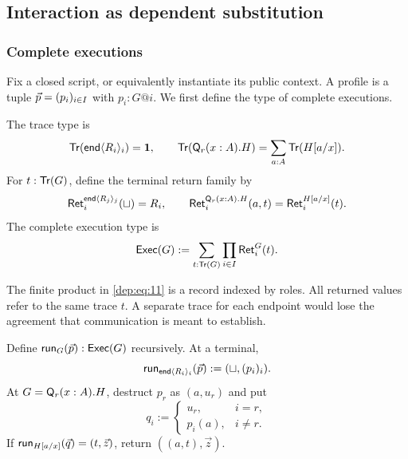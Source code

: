 \subsection{Interaction as dependent substitution}
\label{sec:interaction}

\subsubsection{Complete executions}

Fix a closed script, or equivalently instantiate its public context. A profile
is a tuple $\vec p=(p_i)_{i\in I}$ with $p_i:G@i$.
We first define the type of complete executions.

\begin{definition}
The trace type is
\begin{equation}
 \mathsf{Tr}(\mathsf{end}\langle R_i\rangle_i)=\mathbf 1,
 \qquad
 \mathsf{Tr}(\mathsf Q_r(x:A).H)=\sum_{a:A}\mathsf{Tr}(H[a/x]).
 \label{dep:eq:9}
\end{equation}
For $t:\mathsf{Tr}(G)$, define the terminal return family by
\begin{equation}
 \Ret_i^{\End\langle R_j\rangle_j}(\pointstar)=R_i,
 \qquad
 \Ret_i^{\Q_r(x:A).H}(a,t)=\Ret_i^{H[a/x]}(t).
 \label{dep:eq:10}
\end{equation}
The complete execution type is
\begin{equation}
 \mathsf{Exec}(G):=\sum_{t:\mathsf{Tr}(G)}\prod_{i\in I}\mathsf{Ret}_i^G(t).
 \label{dep:eq:11}
\end{equation}
\end{definition}

The finite product in \eqref{dep:eq:11} is a record indexed by roles. All returned values
refer to the same trace $t$. A separate trace for each endpoint would lose the
agreement that communication is meant to establish.

\begin{definition}[Execution]
\label{def:execution}
Define $\mathsf{run}_G(\vec p):\mathsf{Exec}(G)$ recursively. At a terminal,
\begin{equation}
 \Run_{\End\langle R_i\rangle_i}(\vecp)
       :=(\pointstar,(p_i)_i).
 \label{dep:eq:12}
\end{equation}
At $G=\mathsf Q_r(x:A).H$, destruct $p_r$ as $(a,u_r)$ and put
\begin{equation}
 q_i:=
 \begin{cases}
   u_r,&i=r,\\
   p_i(a),&i\ne r.
 \end{cases}
 \label{dep:eq:13}
\end{equation}
If $\mathsf{run}_{H[a/x]}(\vec q)=(t,\vec z)$, return
$((a,t),\vec z)$.
\end{definition}

